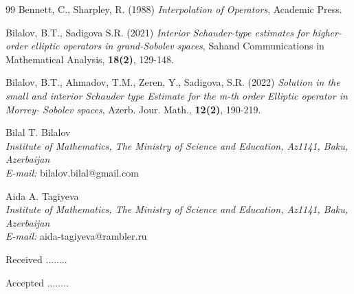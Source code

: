\documentclass{azjmPRE}
\begin{document}
\begin{thebibliography}{99}
 Bennett,  C.,  Sharpley, R. (1988) \textit{Interpolation of Operators}, Academic Press.

  Bilalov, B.T.,   Sadigova S.R. (2021)  \textit{Interior Schauder-type estimates for higher-order elliptic operators in grand-Sobolev spaces},  Sahand Communications in Mathematical Analysis, \textbf{18(2)},  129-148.

  Bilalov, B.T.,   Ahmadov, T.M.,   Zeren, Y.,  Sadigova, S.R. (2022)   \textit{Solution in the small and interior Schauder type Estimate for the m-th order Elliptic operator in Morrey- Sobolev spaces}, Azerb. Jour. Math., \textbf{12(2)}, 190-219.




\end{thebibliography}


\begin{footnotesize}
\begin{flushleft}
Bilal T. Bilalov\\
\textit{Institute of Mathematics, The Ministry of Science and Education,  Az1141, Baku, Azerbaijan}\\
\textit{E-mail:} bilalov.bilal@gmail.com\\
\end{flushleft}
\end{footnotesize}

\begin{footnotesize}
\begin{flushleft}
Aida A. Tagiyeva\\
\textit{Institute of Mathematics, The Ministry of Science and Education, Az1141, Baku, Azerbaijan}\\
\textit{E-mail:} aida-tagiyeva@rambler.ru\\
\end{flushleft}
\end{footnotesize}


Received ........
 
Accepted ........
\end{document}

